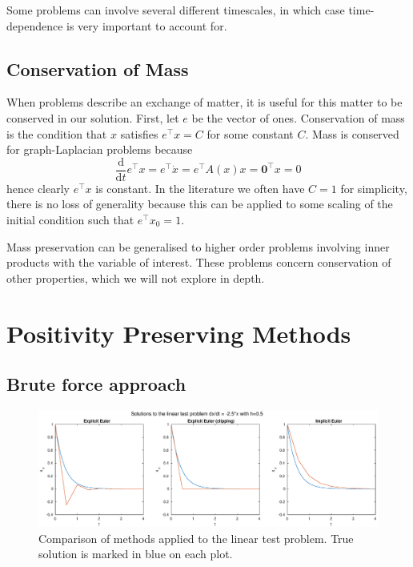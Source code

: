 Some problems can involve several different timescales,
in which case time-dependence is very important to account for.

\subsection{Conservation of Mass}


When problems describe an exchange of matter, it is useful for this matter to be conserved in our solution.
First, let $e$ be the vector of ones.
Conservation of mass is the condition that $x$ satisfies $e^\top x = C$ for some constant $C$.
Mass is conserved for graph-Laplacian problems because
\begin{equation*}
    \frac{\mathrm{d}}{\mathrm{d}t}e^\top x = e^\top \dot{x} = e^\top A(x)x = \mathbf{0}^\top x = 0
\end{equation*}
hence clearly $e^\top x$ is constant.
In the literature \cite{blanes_pos_2022} we often have $C=1$ for simplicity,
there is no loss of generality because this can be applied to some scaling of the initial condition such that $e^\top x_0 = 1$.

Mass preservation can be generalised to higher order problems involving inner products with the variable of interest.
These problems concern conservation of other properties, which we will not explore in depth.

\section{Positivity Preserving Methods}

\subsection{Brute force approach}

\begin{figure}
    \centering
    \includegraphics[width=0.75\linewidth]{Matlab/clippingisbad.eps}
    \caption{
        Comparison of methods applied to the linear test problem.
        True solution is marked in blue on each plot.
    }
    \label{fig:eulertriple}
\end{figure}


